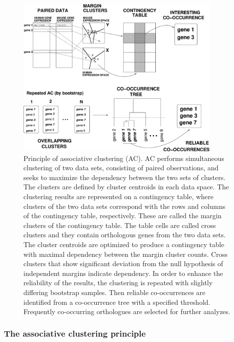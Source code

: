 \begin{figure}[t]
\label{fig:acprinciple}
\centerline{
\includegraphics[width=0.9\textwidth]{pic/settingbs.eps}}
\caption{Principle of associative clustering (AC). AC performs
  simultaneous clustering of two data sets, consisting of paired
  observations, and seeks to maximize the dependency between the two
  sets of clusters.  The clusters are defined by cluster centroids in
  each data space.  The clustering results are represented on a
  contingency table, where clusters of the two data sets correspond
  with the rows and columns of the contingency table,
  respectively. These are called the margin clusters of the
  contingency table. The table cells are called cross clusters and
  they contain orthologous genes from the two data sets.  The cluster
  centroids are optimized to produce a contingency table with maximal
  dependency between the margin cluster counts.  Cross clusters that
  show significant deviation from the null hypothesis of independent
  margins indicate dependency. In order to enhance the reliability of
  the results, the clustering is repeated with slightly differing
  bootstrap samples. Then reliable co-occurrences are identified from
  a co-occurrence tree with a specified threshold. Frequently
  co-occurring orthologues are selected for further analyzes.}
\end{figure}

\subsubsection{The associative clustering principle}

